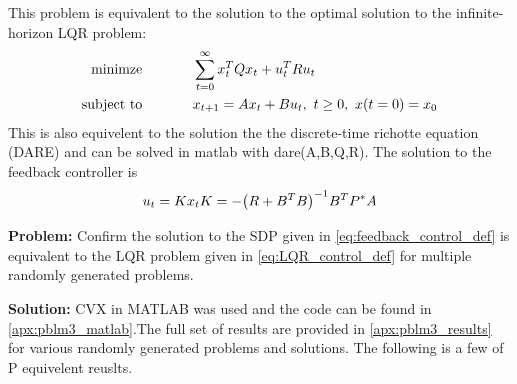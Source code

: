 \documentclass[letter]{article}
\begin{document}
This problem is equivalent to the solution to the optimal solution to the infinite-horizon LQR problem:
\begin{equation}\label{eq:LQR_control_def}
	\begin{aligned}
		\text{minimze} \hspace{0.5in}& \sum_{t=0}^\infty x_t^T Q x_t + u_t^T R u_t\\
		\text{subject to} \hspace{0.5in}
		& x_{t+1} = Ax_t + B u_t, \ t \geq 0, \ x(t=0) = x_0
	\end{aligned}
\end{equation}
This is also equivelent to the solution the the discrete-time richotte equation (DARE) and can be solved in matlab with dare(A,B,Q,R). The solution to the feedback controller is
\begin{equation}\label{eq:LQR_control_solution}
	u_t = K x_t\\
	K = -\qty(R + B^T B)^{-1} B^T P^* A
\end{equation}

\textbf{Problem:}
Confirm the solution to the SDP given in \eqref{eq:feedback_control_def} is equivalent to the LQR problem given in \eqref{eq:LQR_control_def} for multiple randomly generated problems.

\textbf{Solution:}
CVX in MATLAB was used and the code can be found in \appendixname \ref{apx:pblm3_matlab}.The full set of results are provided in \appendixname \ref{apx:pblm3_results} for various randomly generated problems and solutions. The following is a few of P equivelent reuslts.
\end{document}

